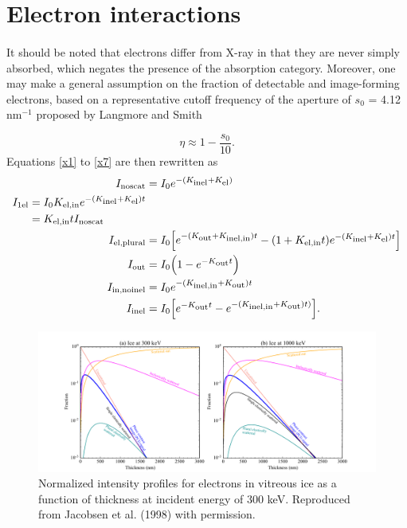 \documentclass[]{article}
\newcommand\nt{\textup{\scriptsize{0}}}
\newcommand\el{\textup{\scriptsize{el}}}
\newcommand\inel{\textup{\scriptsize{inel}}}
\newcommand\elin{\textup{\scriptsize{el,in}}}
\newcommand\inelin{\textup{\scriptsize{inel,in}}}
\newcommand\out{\textup{\scriptsize{out}}}
\newcommand\noscat{\textup{\scriptsize{noscat}}}
\newcommand\sel{\textup{\scriptsize{1el}}}
\newcommand\elpl{\textup{\scriptsize{el,plural}}}
\newcommand\innoinel{\textup{\scriptsize{in,noinel}}}
\begin{document}
\section{Electron interactions}

\paragraph{} It should be noted that electrons differ from X-ray in that they are never simply absorbed, which negates the presence of the absorption category. Moreover, one may make a general assumption on the fraction of detectable and image-forming electrons, based on a representative cutoff frequency of the aperture of $s_0$ = 4.12 $\mathrm{nm}^{-1}$ proposed by Langmore and Smith \cite{Langmore:1992kk}

\begin{equation}
\eta \approx 1 - \frac{s_0}{10}.
\end{equation}
Equations \ref{x1} to \ref{x7} are then rewritten as
\begin{align}
I_{\noscat} &= I_{\nt}e^{-(K_{\inel}+K_{\el})}
\label{e1} \\
\begin{split}
\label{e2}
I_{\sel} &= I_{\nt}K_{\elin}e^{-(K_{\inel}+K_{\el})t} 
	\\ &= K_{\elin}tI_{\noscat} 
\end{split} \\
I_{\elpl} &= I_{\nt} \Big[ e^{-(K_{\out}+K_{\inelin})t} - (1+K_{\elin}t)e^{-(K_{\inel}+K_{\el})t} \Big]
\label{e3} \\
I_{\out} &= I_{\nt} \Big(1 - e^{-K_{\out}t}\Big)
\label{e4} \\
I_{\innoinel} &= I_{\nt}e^{-(K_{\inelin}+K_{\out})t}
\label{e6} \\
I_{\inel} &= I_{\nt}\Big[e^{-K_{\out}t} - e^{-(K_{\inelin}+K_{\out})t)}\Big].
\label{e7}
\end{align}

\begin{figure}[b!]
\begin{center}
\includegraphics[scale=0.6]{unimatrix_fig_e.pdf}
\caption{Normalized intensity profiles for electrons in vitreous ice as a function of thickness at incident energy of 300 keV. Reproduced from Jacobsen et al. (1998) with permission.}
\label{fig:ice_e_cate}
\end{center}
\end{figure}
\end{document}
